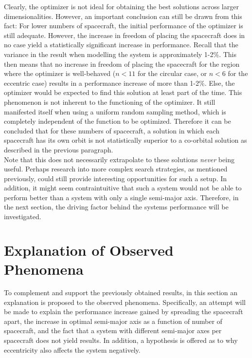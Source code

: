 Clearly, the optimizer is not ideal for obtaining the best solutions across larger dimensionalities. However, an important conclusion can still be drawn from this fact: For lower numbers of spacecraft, the initial performance of the optimizer is still adequate. However, the increase in freedom of placing the spacecraft does in no case yield a statistically significant increase in performance. Recall that the variance in the result when modelling the system is approximately 1-2\%. This then means that no increase in freedom of placing the spacecraft for the region where the optimizer is well-behaved ($n < 11$ for the circular case, or $n < 6$ for the eccentric case) results in a performance increase of more than 1-2\%. Else, the optimizer would be expected to find this solution at least part of the time. This phenomenon is not inherent to the functioning of the optimizer. It still manifested itself when using a uniform random sampling method, which is completely independent of the function to be optimized. Therefore it can be concluded that for these numbers of spacecraft, a solution in which each spacecraft has its own orbit is not statistically superior to a co-orbital solution as described in the previous paragraph. \\

Note that this does not necessarily extrapolate to these solutions \textit{never} being useful. Perhaps research into more complex search strategies, as mentioned previously, could still provide interesting opportunities for such a setup. In addition, it might seem contraintuitive that such a system would not be able to perform better than a system with only a single semi-major axis. Therefore, in the next section, the driving factor behind the systems performance will be investigated.\\

\section{Explanation of Observed Phenomena}
\label{sec:results_explanation}
To complement and support the previously obtained results, in this section an explanation is proposed to the observed phenomena. Specifically, an attempt will be made to explain the performance increase gained by spreading the spacecraft apart, the increase in optimal semi-major axis as a function of number of spacecraft, and the fact that a system with different semi-major axes per spacecraft does not yield results. In addition, a hypothesis is offered as to why eccentricity also affects the system negatively. \\

